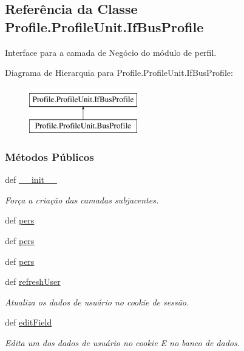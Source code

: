 \hypertarget{classProfile_1_1ProfileUnit_1_1IfBusProfile}{\subsection{Referência da Classe Profile.\-Profile\-Unit.\-If\-Bus\-Profile}
\label{classProfile_1_1ProfileUnit_1_1IfBusProfile}
}


Interface para a camada de Negócio do módulo de perfil.  


Diagrama de Hierarquia para Profile.\-Profile\-Unit.\-If\-Bus\-Profile\-:\begin{figure}[H]
\begin{center}
\leavevmode
\includegraphics[height=2.000000cm]{dc/d47/classProfile_1_1ProfileUnit_1_1IfBusProfile}
\end{center}
\end{figure}
\subsubsection*{Métodos Públicos}
\begin{DoxyCompactItemize}
\item 
def \hyperlink{classProfile_1_1ProfileUnit_1_1IfBusProfile_a3c02bbff4cb54b40edab64d0f9b86a59}{\-\_\-\-\_\-init\-\_\-\-\_\-}
\begin{DoxyCompactList}\small\item\em Força a criação das camadas subjacentes. \end{DoxyCompactList}\item 
def \hyperlink{classProfile_1_1ProfileUnit_1_1IfBusProfile_a996592f4b01e0540f45d042065d5a7f4}{pers}
\item 
def \hyperlink{classProfile_1_1ProfileUnit_1_1IfBusProfile_a996592f4b01e0540f45d042065d5a7f4}{pers}
\item 
def \hyperlink{classProfile_1_1ProfileUnit_1_1IfBusProfile_a996592f4b01e0540f45d042065d5a7f4}{pers}
\item 
def \hyperlink{classProfile_1_1ProfileUnit_1_1IfBusProfile_abe42ebac800e9dcd762e9d73b4a5f9b8}{refresh\-User}
\begin{DoxyCompactList}\small\item\em Atualiza os dados de usuário no cookie de sessão. \end{DoxyCompactList}\item 
def \hyperlink{classProfile_1_1ProfileUnit_1_1IfBusProfile_a1e1a9ec32d2c23c734eaf0ceb6bb8419}{edit\-Field}
\begin{DoxyCompactList}\small\item\em Edita um dos dados de usuário no cookie E no banco de dados. \end{DoxyCompactList}\end{DoxyCompactItemize}

